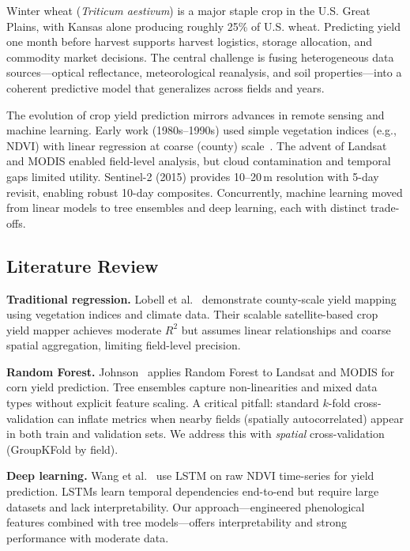 \documentclass[conference]{IEEEtran}
\begin{document}
Winter wheat (\textit{Triticum aestivum}) is a major staple crop in the U.S. Great Plains, with Kansas alone producing roughly 25\% of U.S. wheat. Predicting yield one month before harvest supports harvest logistics, storage allocation, and commodity market decisions. The central challenge is fusing heterogeneous data sources---optical reflectance, meteorological reanalysis, and soil properties---into a coherent predictive model that generalizes across fields and years.

The evolution of crop yield prediction mirrors advances in remote sensing and machine learning. Early work (1980s--1990s) used simple vegetation indices (e.g., NDVI) with linear regression at coarse (county) scale~\cite{lobell2015scaling}. The advent of Landsat and MODIS enabled field-level analysis, but cloud contamination and temporal gaps limited utility. Sentinel-2 (2015) provides 10--20\,m resolution with 5-day revisit, enabling robust 10-day composites. Concurrently, machine learning moved from linear models to tree ensembles and deep learning, each with distinct trade-offs.

\subsection{Literature Review}

\textbf{Traditional regression.} Lobell et al.~\cite{lobell2015scaling} demonstrate county-scale yield mapping using vegetation indices and climate data. Their scalable satellite-based crop yield mapper achieves moderate $R^2$ but assumes linear relationships and coarse spatial aggregation, limiting field-level precision.

\textbf{Random Forest.} Johnson~\cite{johnson2016predicting} applies Random Forest to Landsat and MODIS for corn yield prediction. Tree ensembles capture non-linearities and mixed data types without explicit feature scaling. A critical pitfall: standard $k$-fold cross-validation can inflate metrics when nearby fields (spatially autocorrelated) appear in both train and validation sets. We address this with \emph{spatial} cross-validation (GroupKFold by field).

\textbf{Deep learning.} Wang et al.~\cite{wang2020deep} use LSTM on raw NDVI time-series for yield prediction. LSTMs learn temporal dependencies end-to-end but require large datasets and lack interpretability. Our approach---engineered phenological features combined with tree models---offers interpretability and strong performance with moderate data.
\end{document}
